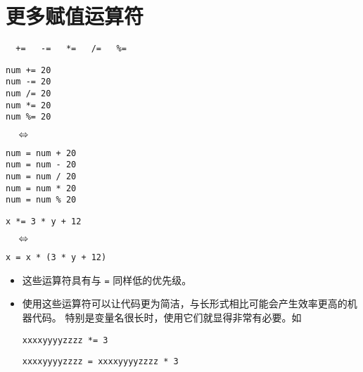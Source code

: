 \section{更多赋值运算符}
\begin{frame}[fragile]\ft{\secname}
\begin{lstlisting}
  +=   -=   *=   /=   %=
\end{lstlisting}
\end{frame}

\begin{frame}[fragile]\ft{\secname}
\begin{minipage}{.4\textwidth}
\begin{lstlisting}
num += 20
num -= 20
num /= 20
num *= 20
num %= 20
\end{lstlisting}
\end{minipage}$\textcolor{blue}~~~\Leftrightarrow~~~$
\begin{minipage}{.4\textwidth}
\begin{lstlisting}
num = num + 20
num = num - 20
num = num / 20
num = num * 20
num = num % 20
\end{lstlisting}
\end{minipage}
\pause 
\begin{minipage}{.4\textwidth}
\begin{lstlisting}
x *= 3 * y + 12
\end{lstlisting}
\end{minipage}$\textcolor{blue}~~~\Leftrightarrow~~~$
\begin{minipage}{.45\textwidth}
\begin{lstlisting}
x = x * (3 * y + 12)
\end{lstlisting}
\end{minipage}
\end{frame}

\begin{frame}[fragile]\ft{\secname}
\begin{itemize}
\item 
这些运算符具有与 \lstinline|=| 同样低的优先级。\\[0.1in]
\item
使用这些运算符可以让代码更为简洁，与长形式相比可能会产生效率更高的机器代码。
特别是变量名很长时，使用它们就显得非常有必要。如

\begin{lstlisting}
xxxxyyyyzzzz *= 3
\end{lstlisting}
\begin{lstlisting}
xxxxyyyyzzzz = xxxxyyyyzzzz * 3
\end{lstlisting}
\end{itemize}
\end{frame}
